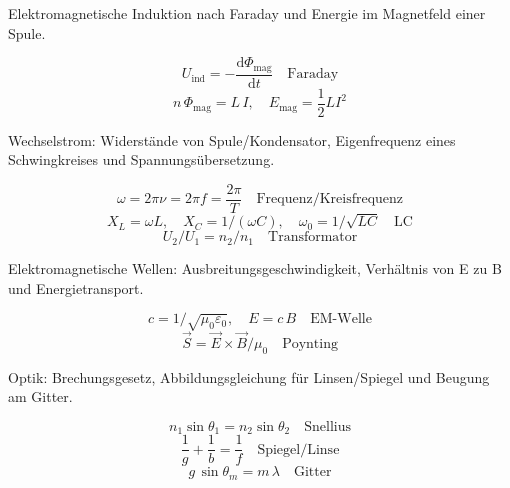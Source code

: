 \begin{runintext}
Elektromagnetische Induktion nach Faraday und Energie im Magnetfeld einer Spule.
\end{runintext}
\begin{formulabox}
\[ U_{\mathrm{ind}} = -\frac{\mathrm{d}\Phi_{\mathrm{mag}}}{\mathrm{d}t} \quad \text{Faraday} \]
\formulasep
\[ n\,\Phi_{\mathrm{mag}} = L\,I, \quad E_{\mathrm{mag}} = \frac{1}{2}LI^2 \]
\end{formulabox}

\begin{runintext}
Wechselstrom: Widerstände von Spule/Kondensator, Eigenfrequenz eines Schwingkreises und Spannungsübersetzung.
\end{runintext}
\begin{formulabox}
\[ \omega = 2\pi\nu = 2\pi f = \frac{2\pi}{T} \quad \text{Frequenz/Kreisfrequenz} \]
\formulasep
\[ X_L = \omega L, \quad X_C = 1/(\omega C), \quad \omega_0 = 1/\sqrt{LC} \quad \text{LC} \]
\formulasep
\[ U_2/U_1 = n_2/n_1 \quad \text{Transformator} \]
\end{formulabox}

\begin{runintext}
Elektromagnetische Wellen: Ausbreitungsgeschwindigkeit, Verhältnis von E zu B und Energietransport.
\end{runintext}
\begin{formulabox}
\[ c = 1/\sqrt{\mu_0\varepsilon_0}, \quad E = c\,B \quad \text{EM-Welle} \]
\formulasep
\[ \vec{S} = \vec{E}\times\vec{B}/\mu_0 \quad \text{Poynting} \]
\end{formulabox}

\begin{runintext}
Optik: Brechungsgesetz, Abbildungsgleichung für Linsen/Spiegel und Beugung am Gitter.
\end{runintext}
\begin{formulabox}
\[ n_1\sin\theta_1 = n_2\sin\theta_2 \quad \text{Snellius} \]
\formulasep
\[ \frac{1}{g}+\frac{1}{b} = \frac{1}{f} \quad \text{Spiegel/Linse} \]
\formulasep
\[ g\,\sin\theta_m = m\,\lambda \quad \text{Gitter} \]
\end{formulabox}

